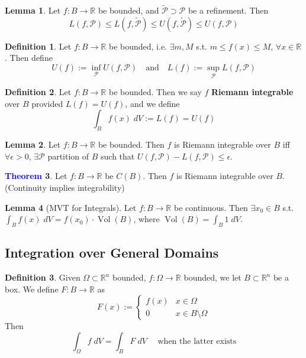 \documentclass[11pt]{article}
\theoremstyle{definition}
\theoremstyle{definition}
\newcommand{\R}[0]{\mathbb{R}}
\DeclareMathOperator{\Vol}{Vol}
\newtheorem{theorem}{\textcolor{blue}{Theorem}}
\newtheorem{lemma}[theorem]{Lemma}
\theoremstyle{definition}
\newtheorem{definition}{\textcolor{OliveGreen}{Definition}}
\theoremstyle{remark}
\begin{document}
\begin{lemma}
    Let $f : B \to \R$ be bounded, and $\tilde{\mathcal{P}} \supset \mathcal{P}$ be a refinement. Then
    \[
        L(f, \mathcal{P}) \leq L(f, \mathcal{\tilde{P}}) \leq U(f, \mathcal{\tilde{P}}) \leq U(f, \mathcal{P})
    \] 
\end{lemma}

\begin{definition}
    Let $f : B \to \R$ be bounded, i.e. $\exists m, M$ s.t. $m \leq f(x) \leq M$, $\forall x \in \R$. Then define
    \[
        U(f) := \inf_{\mathcal{P}} U(f, \mathcal{P}) \quad \text{and} \quad L(f) := \sup_{\mathcal{P}} L(f, \mathcal{P})
    \]   
\end{definition}

\begin{definition}
    Let $f : B \to \R$ be bounded. Then we say $f$ \textbf{Riemann integrable} over $B$ provided $L(f) = U(f)$, and we define
    \[
        \int_B f(x) \; dV := L(f) = U(f)
    \]   
\end{definition}

\begin{lemma}
    Let $f : B \to \R$ be bounded. Then $f$ is Riemann integrable over $B$ iff $\forall \epsilon > 0$, $\exists \mathcal{P}$ partition
    of $B$ such that $U(f, \mathcal{P}) - L(f, \mathcal{P}) \leq \epsilon$.    
\end{lemma}

\begin{theorem}
    Let $f : B \to \R$ be $C(B)$. Then $f$ is Riemann integrable over $B$. (Continuity implies integrability)  
\end{theorem}

\begin{lemma}[MVT for Integrals]
    Let $f : B \to \R$ be continuous. Then $\exists x_0 \in B$ s.t. $\int_B f(x) \; dV = f(x_0) \cdot \Vol(B)$, where
    $\Vol(B) = \int_B 1 \; dV$. 
\end{lemma}

\subsection{Integration over General Domains}

\begin{definition}
    Given $\Omega \subset \R^n$ bounded, $f : \Omega \to \R$ bounded, we let $B \subset \R^n$ be a box.
    We define $F : B \to \R$ as 
    \[
        F(x) := \begin{cases}
            f(x) & x \in \Omega \\
            0 & x \in B \setminus \Omega
        \end{cases}
    \]     
    Then
    \[
        \int_{\Omega} f \; dV = \int_B F \; dV \quad \text{ when the latter exists}
    \] 
\end{definition}
\end{document}
